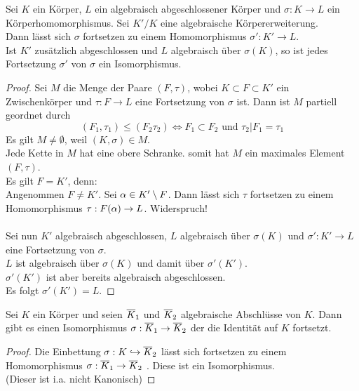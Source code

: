 	 \begin{theorem}[Fortsetzungssatz]\label{satz:Fortsetzung}
	 	Sei $K$ ein Körper, $L$ ein algebraisch abgeschlossener Körper und $\sigma:K\to L$ ein Körperhomomorphismus. Sei $K'/K$ eine algebraische Körpererweiterung.\\
	 	Dann lässt sich $\sigma$ fortsetzen zu einem Homomorphismus $\sigma':K'\to L$.\\
	 	Ist $K'$ zusätzlich abgeschlossen und $L$ algebraisch über $\sigma(K)$, so ist jedes Fortsetzung $\sigma'$ von $\sigma$ ein Isomorphismus.
	 \end{theorem}
 	\begin{proof}
 		Sei $M$ die Menge der Paare $(F,\tau)$, wobei $K\subset F\subset K'$ ein Zwischenkörper und $\tau:F\to L$ eine Fortsetzung von $\sigma$ ist. Dann ist $M$ partiell geordnet durch
 		\[(F_1,\tau_1)\leq (F_2\tau_2)\Leftrightarrow F_1\subset F_2\text{ und }\tau_2|F_1=\tau_1\]
 		Es gilt $M\neq\emptyset$, weil $(K,\sigma)\in M$.\\
 		Jede Kette in $M$ hat eine obere Schranke. somit hat $M$ ein maximales Element $(F,\tau)$. \\
 		Es gilt $F=K'$, denn:\\
 		Angenommen $F\neq K'$. Sei $\alpha\in K'\setminus F$. Dann lässt sich $\tau$ fortsetzen zu einem Homomorphismus $\tau:F(\alpha)\to L$. Widerspruch!\\
 		\\
 		Sei nun $K'$ algebraisch abgeschlossen, $L$ algebraisch über $\sigma(K)$ und $\sigma':K'\to L$ eine Fortsetzung von $\sigma$.\\
 		$L$ ist algebraisch über $\sigma(K)$ und damit über  $\sigma'(K')$.\\
 		$\sigma'(K')$ ist aber bereits algebraisch abgeschlossen.\\
 		Es folgt $\sigma'(K')=L$.
 	\end{proof}
 
 	\begin{kor}
 		Sei $K$ ein Körper und seien $\overline{K}_1$ und $\overline{K}_2$ algebraische Abschlüsse von $K$. Dann gibt es einen Isomorphismus $\sigma:\overline{K}_1\to \overline{K}_2$ der die Identität auf $K$ fortsetzt.
 	\end{kor}
 	\begin{proof}
 		Die Einbettung $\sigma:K\hookrightarrow \overline{K}_2$ lässt sich fortsetzen zu einem Homomorphismus $\sigma:\overline{K}_1\to\overline{K}_2$ . Diese ist ein Isomorphismus.\\
 		(Dieser ist i.a. nicht Kanonisch)
 	\end{proof}
 
